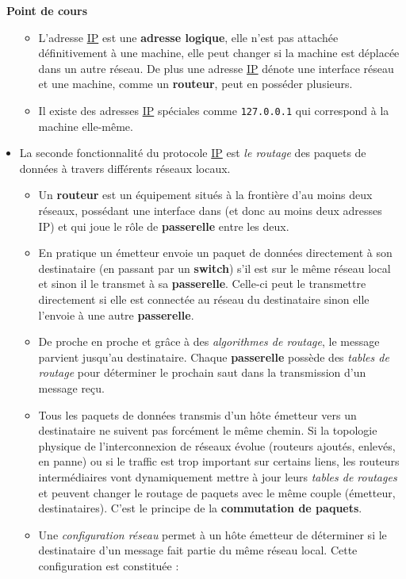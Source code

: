 \documentclass[
  11pt,
]{article}
\newcommand{\passthrough}[1]{#1}
\providecommand{\tightlist}{%
  \setlength{\itemsep}{0pt}\setlength{\parskip}{0pt}}
\newcounter{thme}
\newcounter{cours}
\newenvironment{cours}[1]
{\par \medskip   \addtocounter{cours}{1} \noindent  
\begin{bclogo}[arrondi =0.1,  ombre = true, barre=none, logo=\bcbook, marge=4]{~\textbf{Point de cours} \textbf{\thecours} {\itshape #1} }  \par}
{
\end{bclogo}
 \par \bigskip }
\newcounter{alg}
\newcounter{logi}
\begin{document}
\begin{cours}{}
\begin{itemize}
  \begin{itemize}
  \tightlist
  \item
    L'adresse \href{https://fr.wikipedia.org/wiki/Internet_Protocol}{IP}
    est une \textbf{adresse logique}, elle n'est pas attachée
    définitivement à une machine, elle peut changer si la machine est
    déplacée dans un autre réseau. De plus une adresse
    \href{https://fr.wikipedia.org/wiki/Internet_Protocol}{IP} dénote
    une interface réseau et une machine, comme un \textbf{routeur}, peut
    en posséder plusieurs.
  \item
    Il existe des adresses
    \href{https://fr.wikipedia.org/wiki/Internet_Protocol}{IP} spéciales
    comme \passthrough{\lstinline!127.0.0.1!} qui correspond à la
    machine elle-même.
  \end{itemize}
\item
  La seconde fonctionnalité du protocole
  \href{https://fr.wikipedia.org/wiki/Internet_Protocol}{IP} est
  \emph{le routage} des paquets de données à travers différents réseaux
  locaux.

  \begin{itemize}
  \tightlist
  \item
    Un \textbf{routeur} est un équipement situés à la frontière d'au
    moins deux réseaux, possédant une interface dans (et donc au moins
    deux adresses IP) et qui joue le rôle de \textbf{passerelle} entre
    les deux.
  \item
    En pratique un émetteur envoie un paquet de données directement à
    son destinataire (en passant par un \textbf{switch}) s'il est sur le
    même réseau local et sinon il le transmet à sa \textbf{passerelle}.
    Celle-ci peut le transmettre directement si elle est connectée au
    réseau du destinataire sinon elle l'envoie à une autre
    \textbf{passerelle}.
  \item
    De proche en proche et grâce à des \emph{algorithmes de routage}, le
    message parvient jusqu'au destinataire. Chaque \textbf{passerelle}
    possède des \emph{tables de routage} pour déterminer le prochain
    saut dans la transmission d'un message reçu.
  \item
    Tous les paquets de données transmis d'un hôte émetteur vers un
    destinataire ne suivent pas forcément le même chemin. Si la
    topologie physique de l'interconnexion de réseaux évolue (routeurs
    ajoutés, enlevés, en panne) ou si le traffic est trop important sur
    certains liens, les routeurs intermédiaires vont dynamiquement
    mettre à jour leurs \emph{tables de routages} et peuvent changer le
    routage de paquets avec le même couple (émetteur, destinataires).
    C'est le principe de la \textbf{commutation de paquets}.
  \item
    Une \emph{configuration réseau} permet à un hôte émetteur de
    déterminer si le destinataire d'un message fait partie du même
    réseau local. Cette configuration est constituée :


\end{itemize}
\end{itemize}
\end{cours}
\end{document}
